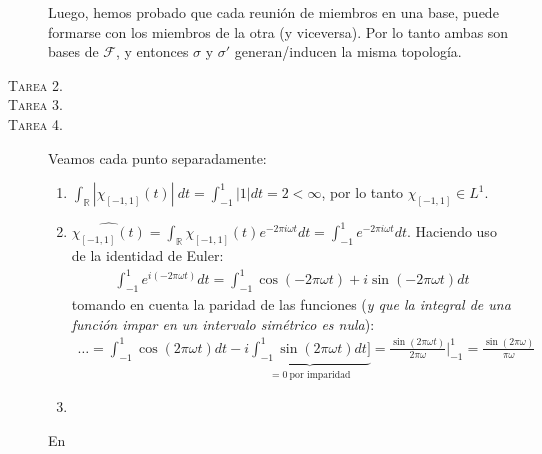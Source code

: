 \documentclass[spanish, fleqn]{article}
\begin{document}
\begin{description}
	Luego, hemos probado que cada reunión de miembros en una base, puede formarse con los miembros de la otra (y viceversa). Por lo tanto ambas son bases de $\mathcal{F}$, y entonces $\sigma$ y $\sigma'$ generan/inducen la misma topología.




	\item[\textsc{Tarea 2.}]




	\item[\textsc{Tarea 3.}]




	\item[\textsc{Tarea 4.}] Veamos cada punto separadamente:
	\begin{enumerate}
		\item $\displaystyle \int_{\mathbb{R}} |\chi_{[-1,1]}(t)|\ dt = \int_{-1}^{1} |1| dt = 2 < \infty$, por lo tanto $\chi_{[-1,1]} \in L^1$.
		\item $\displaystyle \widehat{\chi_{[-1,1]}(t)} = \int_{\mathbb{R}} \chi_{[-1,1]}(t) e^{-2 \pi i \omega t} dt = \int_{-1}^{1} e^{-2 \pi i \omega t} dt$. Haciendo uso de la identidad de Euler:
		\begin{align*}
			\int_{-1}^{1} e^{i (-2 \pi \omega t)} dt = \int_{-1}^{1} \cos(-2 \pi \omega t) + i \sin(-2 \pi \omega t) dt
		\end{align*}
		tomando en cuenta la paridad de las funciones (\textit{y que la integral de una función impar en un intervalo simétrico es nula}):
		\begin{align*}
			\ldots = \int_{-1}^{1} \cos(2 \pi \omega t) dt - i \underbrace{\int_{-1}^{1} \sin(2 \pi \omega t) dt]}_{= 0 \ \text{por imparidad}} = \frac{\sin(2 \pi \omega t)}{2 \pi \omega} \bigg|_{-1}^{1} = \frac{\sin(2 \pi \omega)}{\pi \omega}
		\end{align*}
		\item

	\end{enumerate}En





\end{description}
\end{document}
